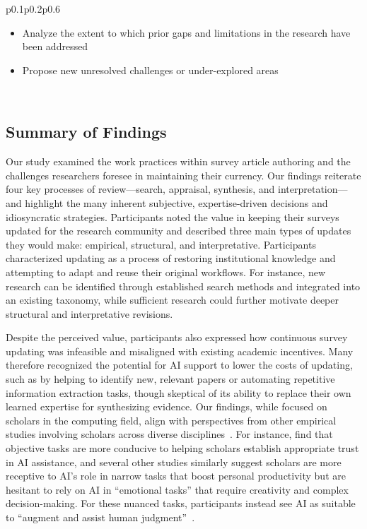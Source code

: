 \begin{table*}[t]
\begin{tabular}{p{0.1\textwidth}p{0.2\textwidth}p{0.6\textwidth}}
\begin{minipage}[t]{\linewidth}
\begin{itemize}[leftmargin=*]
        \item Analyze the extent to which prior gaps and limitations in the research have been addressed
        \item Propose new unresolved challenges or under-explored areas
    \end{itemize}
    \vspace{0.3em}
\end{minipage} \\
\bottomrule
\end{tabular}
\label{tab:updates_and_ai_support}
\end{table*}

\subsection{Summary of Findings}
Our study examined the work practices within survey article authoring and the challenges researchers foresee in maintaining their currency. Our findings reiterate four key processes of review---search, appraisal, synthesis, and interpretation---and highlight the many inherent subjective, expertise-driven decisions and idiosyncratic strategies. Participants noted the value in keeping their surveys updated for the research community and described three main types of updates they would make: empirical, structural, and interpretative. Participants characterized updating as a process of restoring institutional knowledge and attempting to adapt and reuse their original workflows. For instance, new research can be identified through established search methods and integrated into an existing taxonomy, while sufficient research could further motivate deeper structural and interpretative revisions.

Despite the perceived value, participants also expressed how continuous survey updating was infeasible and misaligned with existing academic incentives. Many therefore recognized the potential for AI support to lower the costs of updating, such as by helping to identify new, relevant papers or automating repetitive information extraction tasks, though skeptical of its ability to replace their own learned expertise for synthesizing evidence. Our findings, while focused on scholars in the computing field, align with perspectives from other empirical studies involving scholars across diverse disciplines~\cite{messeri2024artificial, morris_scientists_2023, chubb2022speeding}. For instance, \citet{messeri2024artificial} find that objective tasks are more conducive to helping scholars establish appropriate trust in AI assistance, and several other studies similarly suggest scholars are more receptive to AI's role in narrow tasks that boost personal productivity but are hesitant to rely on AI in ``emotional tasks'' that require creativity and complex decision-making. For these nuanced tasks, participants instead see AI as suitable to ``augment and assist human judgment''~\cite{chubb2022speeding}.


